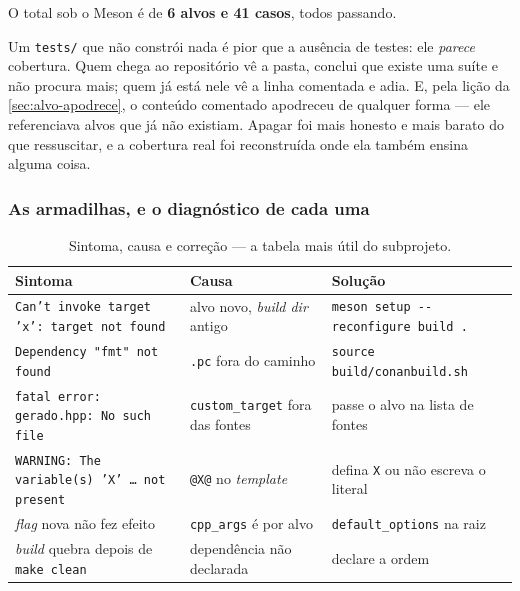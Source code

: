 O total sob o Meson é de \textbf{6 alvos e 41 casos}, todos passando.

\begin{porque}
Um \texttt{tests/} que não constrói nada é pior que a ausência de testes: ele
\emph{parece} cobertura. Quem chega ao repositório vê a pasta, conclui que
existe uma suíte e não procura mais; quem já está nele vê a linha comentada e
adia. E, pela lição da \cref{sec:alvo-apodrece}, o conteúdo comentado
apodreceu de qualquer forma --- ele referenciava alvos que já não existiam.
Apagar foi mais honesto e mais barato do que ressuscitar, e a cobertura real
foi reconstruída onde ela também ensina alguma coisa.
\end{porque}

\subsubsection{As armadilhas, e o diagnóstico de cada uma}

\begin{table}[htbp]
\centering
\caption{Sintoma, causa e correção --- a tabela mais útil do subprojeto.}
\label{tab:meson-armadilhas}
\footnotesize
\begin{tabular}{@{}p{}p{}p{}@{}}
\toprule
\textbf{Sintoma} & \textbf{Causa} & \textbf{Solução} \\
\midrule
\texttt{Can't invoke target 'x': target not found} & alvo novo, \emph{build dir} antigo & \texttt{meson setup -{}-reconfigure build .} \\
\texttt{Dependency "fmt" not found} & \texttt{.pc} fora do caminho & \texttt{source build/conanbuild.sh} \\
\texttt{fatal error: gerado.hpp: No such file} & \texttt{custom\_target} fora das fontes & passe o alvo na lista de fontes \\
\texttt{WARNING: The variable(s) 'X' … not present} & \texttt{@X@} no \emph{template} & defina \texttt{X} ou não escreva o literal \\
\emph{flag} nova não fez efeito & \texttt{cpp\_args} é por alvo & \texttt{default\_options} na raiz \\
\emph{build} quebra depois de \texttt{make clean} & dependência não declarada & declare a ordem \\
\bottomrule
\end{tabular}
\end{table}

